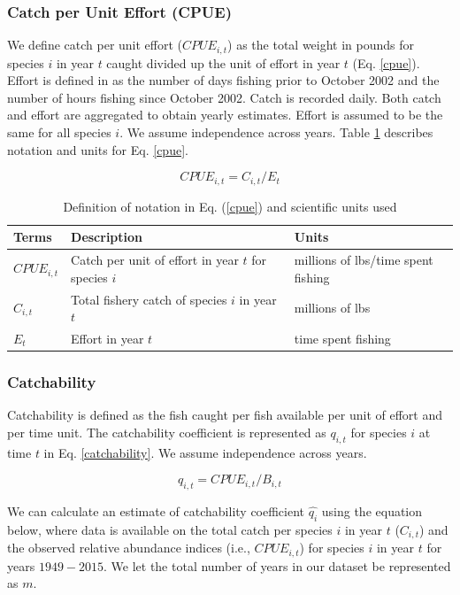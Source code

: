 \documentclass[oneside,12pt,final]{sty/ucthesis-CA2012}
\begin{document}
\begin{mainmatter}
\subsubsection*{Catch per Unit Effort (CPUE)}
We define catch per unit effort ($CPUE_{i,t}$) as the total weight in pounds for species $i$ in year $t$ caught divided up the unit of effort in year $t$ (Eq. \ref{cpue}). Effort is defined in \citet{langseth2018stock} as the number of days fishing prior to October 2002 and the number of hours fishing since October 2002. Catch is recorded daily. Both catch and effort are aggregated to obtain yearly estimates. Effort is assumed to be the same for all species $i$. We assume independence across years. Table \ref{cpue_table} describes notation and units for Eq. \ref{cpue}.

\begin{equation} \label{cpue}
CPUE_{i,t} = C_{i,t}/E_t 
\end{equation}

\begin{table}[H]
\centering
\caption{Definition of notation in Eq. (\ref{cpue}) and scientific units used}
\begin{tabular}{l|l|l}
  \hline \small
 Terms & Description & Units  \\ 
   \hline     
   $CPUE_{i,t}$ & Catch per unit of effort in year $t$ for species $i$ & millions of lbs/time spent fishing \\
   $C_{i,t}$ & Total fishery catch of species $i$ in year $t$ & millions of lbs \\
   $E_t$ & Effort in year $t$ & time spent fishing \\
   \hline
\end{tabular} 
\label{cpue_table}
\end{table}

\subsubsection*{Catchability}
Catchability is defined as the fish caught per fish available per unit of effort and per time unit. The catchability coefficient is represented as $q_{i,t}$ for species $i$ at time $t$ in Eq. \ref{catchability}. We assume independence across years. 

\begin{equation} \label{catchability}
q_{i,t} = CPUE_{i,t}/B_{i,t}
\end{equation}

We can calculate an estimate of catchability coefficient $\widehat{q_{i}}$ using the equation below, where data is available on the total catch per species $i$ in year $t$ ($C_{i,t}$) and the observed relative abundance indices (i.e., $CPUE_{i,t}$) for species $i$ in year $t$ for years $1949-2015$. We let the total number of years in our dataset be represented as $m$. 


\end{mainmatter}
\end{document}
